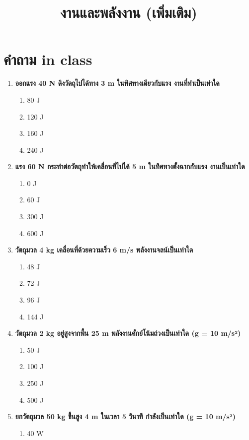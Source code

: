 \documentclass[12pt]{article}
\begin{document}
\title{งานและพลังงาน (เพิ่มเติม)}
\maketitle
\section*{คำถาม in class}
\begin{enumerate}
\def\labelenumi{\arabic*.}
\normalfont
\item \textbf{ออกแรง 40 N ดึงวัตถุไปได้ทาง 3 m ในทิศทางเดียวกับแรง งานที่ทำเป็นเท่าใด}
\begin{enumerate}[label=\alph*)]
\item 80 J
\item 120 J
\item 160 J
\item 240 J
\end{enumerate}
\item \textbf{แรง 60 N กระทำต่อวัตถุทำให้เคลื่อนที่ไปได้ 5 m ในทิศทางตั้งฉากกับแรง งานเป็นเท่าใด}
\begin{enumerate}[label=\alph*)]
\item 0 J
\item 60 J
\item 300 J
\item 600 J
\end{enumerate}
\item \textbf{วัตถุมวล 4 kg เคลื่อนที่ด้วยความเร็ว 6 m/s พลังงานจลน์เป็นเท่าใด}
\begin{enumerate}[label=\alph*)]
\item 48 J
\item 72 J
\item 96 J
\item 144 J
\end{enumerate}
\item \textbf{วัตถุมวล 2 kg อยู่สูงจากพื้น 25 m พลังงานศักย์โน้มถ่วงเป็นเท่าใด (g = 10 m/s²)}
\begin{enumerate}[label=\alph*)]
\item 50 J
\item 100 J
\item 250 J
\item 500 J
\end{enumerate}
\item \textbf{ยกวัตถุมวล 50 kg ขึ้นสูง 4 m ในเวลา 5 วินาที กำลังเป็นเท่าใด (g = 10 m/s²)}
\begin{enumerate}[label=\alph*)]
\item 40 W

\end{enumerate}
\end{enumerate}
\end{document}

